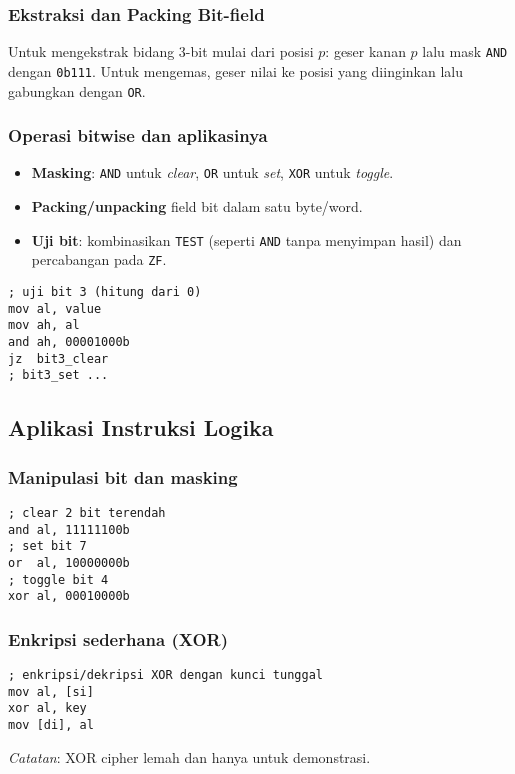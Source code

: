 \subsubsection{Ekstraksi dan Packing Bit-field}
Untuk mengekstrak bidang 3-bit mulai dari posisi \(p\): geser kanan \(p\) lalu mask \texttt{AND} dengan \texttt{0b111}. Untuk mengemas, geser nilai ke posisi yang diinginkan lalu gabungkan dengan \texttt{OR}. \cite{osdev_wiki}

\subsubsection{Operasi bitwise dan aplikasinya}
\begin{itemize}
  \item \textbf{Masking}: \texttt{AND} untuk \textit{clear}, \texttt{OR} untuk \textit{set}, \texttt{XOR} untuk \textit{toggle}.
  \item \textbf{Packing/unpacking} field bit dalam satu byte/word.
  \item \textbf{Uji bit}: kombinasikan \texttt{TEST} (seperti \texttt{AND} tanpa menyimpan hasil) dan percabangan pada \texttt{ZF}.
\end{itemize}
\begin{verbatim}
; uji bit 3 (hitung dari 0)
mov al, value
mov ah, al
and ah, 00001000b
jz  bit3_clear
; bit3_set ...
\end{verbatim}

\subsection{Aplikasi Instruksi Logika}
\subsubsection{Manipulasi bit dan masking}
\begin{verbatim}
; clear 2 bit terendah
and al, 11111100b
; set bit 7
or  al, 10000000b
; toggle bit 4
xor al, 00010000b
\end{verbatim}

\subsubsection{Enkripsi sederhana (XOR)}
\begin{verbatim}
; enkripsi/dekripsi XOR dengan kunci tunggal
mov al, [si]
xor al, key
mov [di], al
\end{verbatim}
\textit{Catatan}: XOR cipher lemah dan hanya untuk demonstrasi.

